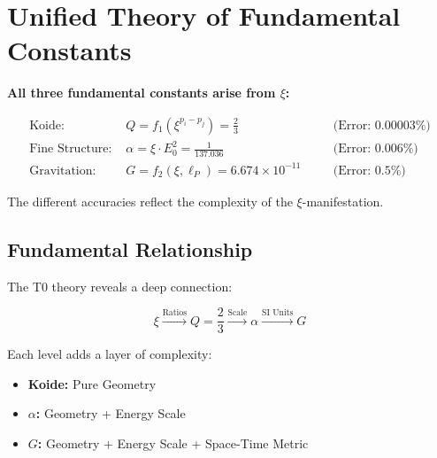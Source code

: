 
	\section{Unified Theory of Fundamental Constants}
	
	\begin{folgerung}
		\textbf{All three fundamental constants arise from $\xi$:}
		
		\begin{align}
			\text{Koide: } & Q = f_1(\xi^{p_i - p_j}) = \frac{2}{3} \quad &&\text{(Error: } 0.00003\%) \\
			\text{Fine Structure: } & \alpha = \xi \cdot E_0^2 = \frac{1}{137.036} \quad &&\text{(Error: } 0.006\%) \\
			\text{Gravitation: } & G = f_2(\xi, \ell_P) = 6.674 \times 10^{-11} \quad &&\text{(Error: } 0.5\%)
		\end{align}
		
		The different accuracies reflect the complexity of the $\xi$-manifestation.
	\end{folgerung}
	
	\subsection{Fundamental Relationship}
	
	The T0 theory reveals a deep connection:
	
	\begin{equation}
		\boxed{\xi \xrightarrow{\text{Ratios}} Q = \frac{2}{3} \xrightarrow{\text{Scale}} \alpha \xrightarrow{\text{SI Units}} G}
	\end{equation}
	
	Each level adds a layer of complexity:
	\begin{itemize}
		\item \textbf{Koide:} Pure Geometry
		\item \textbf{$\alpha$:} Geometry + Energy Scale
		\item \textbf{$G$:} Geometry + Energy Scale + Space-Time Metric
	\end{itemize}
	